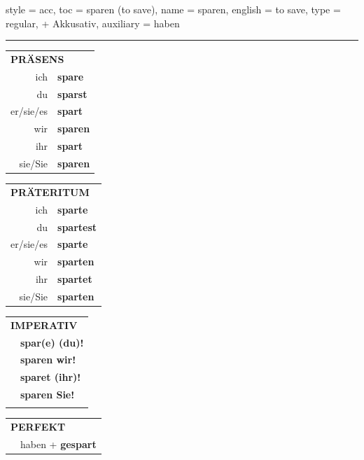 \begin{verbentry}{
  style = {acc},
  toc = {sparen (to save)},
  name = {sparen},
  english = {to save},
  type = {regular, + Akkusativ},
  auxiliary = {haben}
}
 
    
     \vspace{5pt}

    \hrule
    
    \vspace{5pt}

  \begin{tabular}{rl}
     \multicolumn{2}{l}{\textbf{PRÄSENS} }\\
    ich & \textbf{spare}\\
    du & \textbf{sparst}\\
    er/sie/es & \textbf{spart}\\
    wir & \textbf{sparen}\\
    ihr & \textbf{spart}\\
    sie/Sie & \textbf{sparen}\\
  \end{tabular}
  \hfill
     \begin{tabular}{rl}
    \multicolumn{2}{l}{\textbf{PRÄTERITUM} }\\
    ich & \textbf{sparte}\\
    du & \textbf{spartest}\\
    er/sie/es & \textbf{sparte}\\
    wir & \textbf{sparten}\\
    ihr & \textbf{spartet}\\
    sie/Sie & \textbf{sparten}\\
  \end{tabular}
  \hfill
  \begin{tabular}{rl}
     \multicolumn{2}{l}{\textbf{IMPERATIV} }\\
   & \textbf{spar(e) (du)!}\\
   & \textbf{sparen wir!}\\
   & \textbf{sparet (ihr)!}\\
   & \textbf{sparen Sie!}\\
   & \vspace{10pt}
  \end{tabular}

    \vspace{10pt}

 \begin{tabular}{rl}
     \multicolumn{2}{l}{\textbf{PERFEKT}}\\
  &  haben + \textbf{gespart}\\
  \end{tabular}
\hfill
   \begin{tabular}{rl}
   

\end{tabular}
\end{verbentry}
